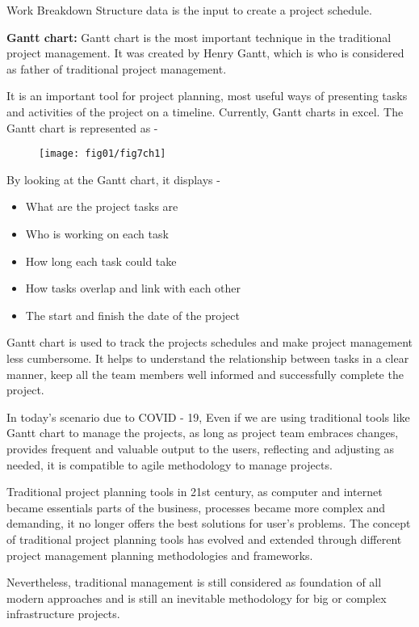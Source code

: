 Work Breakdown Structure data is the input to create a project schedule.

\textbf{Gantt chart:} Gantt chart is the most important technique in the traditional project management. It was created by Henry Gantt, which is who is considered as father of traditional project management.

It is an important tool for project planning, most useful ways of presenting tasks and activities of the project on a timeline. Currently, Gantt charts in excel. The Gantt chart is represented as -
 
\begin{figure}
	\centering
	\texttt{[image: fig01/fig7ch1]}
\end{figure}
 
 
By looking at the Gantt chart, it displays - 

\begin{itemize}
    \item What are the project tasks are 
    \item Who is working on each task 
    \item How long each task could take 
    \item How tasks overlap and link with each other 
    \item The start and finish the date of the project
\end{itemize}

Gantt chart is used to track the projects schedules and make project management less cumbersome. It helps to understand the relationship between tasks in a clear manner, keep all the team members well informed and successfully complete the project.

In today's scenario due to COVID - 19, Even if we are using traditional tools like Gantt chart to manage the projects, as long as project team embraces changes, provides frequent and valuable output to the users, reflecting and adjusting as needed, it is compatible to agile methodology to manage projects. 

Traditional project planning tools in 21st century, as computer and internet became essentials parts of the business, processes became more complex and demanding, it no longer offers the best solutions for user's problems. The concept of traditional project planning tools has evolved and extended through different project management planning methodologies and frameworks.

Nevertheless, traditional management is still considered as foundation of all modern approaches and is still an inevitable methodology for big or complex infrastructure projects.
\\


